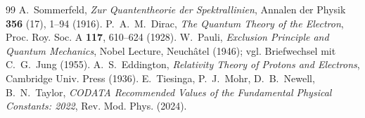 \documentclass[11pt,a4paper]{article}
\begin{document}
\begin{thebibliography}{99}
 A.~Sommerfeld, \emph{Zur Quantentheorie der Spektrallinien}, Annalen der Physik \textbf{356} (17), 1--94 (1916).
 P.~A.~M.~Dirac, \emph{The Quantum Theory of the Electron}, Proc. Roy. Soc. A \textbf{117}, 610--624 (1928).
 W.~Pauli, \emph{Exclusion Principle and Quantum Mechanics}, Nobel Lecture, Neuchâtel (1946); vgl. Briefwechsel mit C.~G.~Jung (1955).
 A.~S.~Eddington, \emph{Relativity Theory of Protons and Electrons}, Cambridge Univ. Press (1936).
 E.~Tiesinga, P.~J.~Mohr, D.~B.~Newell, B.~N.~Taylor, \emph{CODATA Recommended Values of the Fundamental Physical Constants: 2022}, Rev. Mod. Phys. (2024).
\end{thebibliography}
\end{document}
